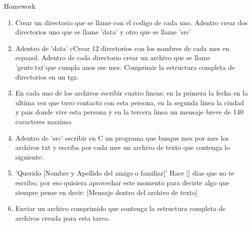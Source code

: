 \documentclass{article}
\begin{document}
Homework\\
\begin{enumerate}
\item
Crear un directorio que se llame con el codigo de cada uno.
Adentro crear dos directorios uno que se llame 'data' y otro que se llame 'src'

\item
Adentro de 'data' cCrear 12 directorios con los nombres de cada mes en espanol.
Adentro de cada directorio crear un archivo que se llame 'gente.txt'que cumpla anos ese mes.
Comprimir la estructura completa de directorios en un tgz.

\item
En cada uno de los archivos escribir cuatro lineas: en la primera la fecha en la ultima vez que tuvo contacto con esta persona, en la segunda linea la ciudad y pais donde vive esta persona y en la tercera linea un mensaje breve de 140 caracteres maximo.

\item
Adentro de 'src' escribir en C un programa que busque mes por mes los archivos txt y escriba por cada mes un
archivo de texto que contenga lo siguiente:

\item
'Querido [Nombre y Apellido del amigo o familiar]'
Hace [] dias que no te escribo, por eso quisiera aprovechar este momento para decirte algo que siempre 
pense en decir: [Mensaje dentro del archivo de texto]

\item
Enviar un archivo comprimido que contenga la estructura completa de archivos creada para esta tarea.
\end{enumerate}
\end{document}
